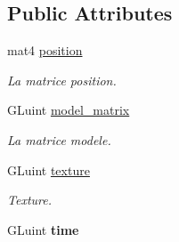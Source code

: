 \subsection*{Public Attributes}
\begin{DoxyCompactItemize}
\item 
\mbox{\label{classSun_a35e64b0836ac476a5ee32ec14160e3d0}} 
mat4 \mbox{\hyperlink{classSun_a35e64b0836ac476a5ee32ec14160e3d0}{position}}
\begin{DoxyCompactList}\small\item\em La matrice position. \end{DoxyCompactList}\item 
\mbox{\label{classSun_a0b0ae08a61f9fe139ab9a9950d5a523e}} 
G\+Luint \mbox{\hyperlink{classSun_a0b0ae08a61f9fe139ab9a9950d5a523e}{model\+\_\+matrix}}
\begin{DoxyCompactList}\small\item\em La matrice modele. \end{DoxyCompactList}\item 
\mbox{\label{classSun_aa7d24617197997c2d401cb555b3a3459}} 
G\+Luint \mbox{\hyperlink{classSun_aa7d24617197997c2d401cb555b3a3459}{texture}}
\begin{DoxyCompactList}\small\item\em Texture. \end{DoxyCompactList}\item 
\mbox{\label{classSun_a44f32c835ec25ddb79c69692fe816b58}} 
G\+Luint {\bfseries time}
\end{DoxyCompactItemize}
